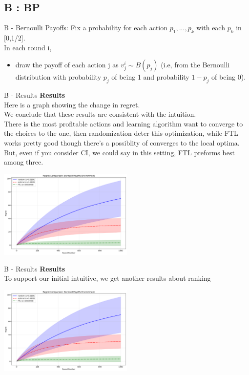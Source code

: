 \documentclass{beamer}
\begin{document}
\subsection{B : BP}

\begin{frame}{B - Bernoulli Payoffs:}
    Fix a probability for each action $p_{1},...,p_{k}$ with each $p_{k}$ in [0,1/2].\\
    In each round i,
    \begin{itemize}
        \item draw the payoff of each action j as $v^{i}_{j} \sim B(p_{j})$ (i.e, from the Bernoulli distribution with probability $p_j$ of being 1 and probability $1-p_{j}$ of being 0).
    \end{itemize}
\end{frame}

\begin{frame}{B - Results}
\textbf{Results}\\
Here is a graph showing the change in regret. \\
We conclude that these results are consistent with the intuition. \\
There is the most profitable actions and learning algorithm want to converge to the choices to the one, then randomization deter this optimization, while FTL works pretty good though there's a possiblity of converges to the local optima. But, even if you consider CI, we could say in this setting, FTL preforms best among three.
\begin{center}
    \includegraphics[width=0.5\textwidth]{332Project2/figures/bernoulli_regret_comparison.png}
\end{center}
\end{frame}

\begin{frame}{B - Results}
\textbf{Results}\\
To support our initial intuitive, we get another results about ranking
\begin{center}
    \includegraphics[width=0.5\textwidth]{332Project2/figures/bernoulli_regret_comparison.png}
\end{center}
\end{frame}
\end{document}
